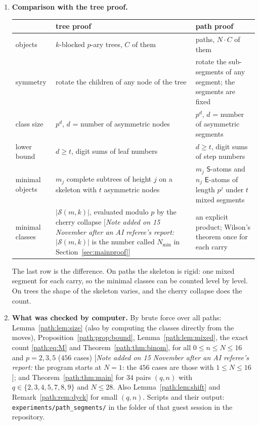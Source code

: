 \documentclass[11pt]{article}
\theoremstyle{definition}
\theoremstyle{remark}
\numberwithin{equation}{section}
\numberwithin{figure}{section}
\newcommand{\E}{\textsf{E}}
\newcommand{\Ss}{\textsf{S}}
\newcommand{\refnote}[1]{[\emph{Note added on 15 November after an AI referee's report:} #1]}
\begin{document}
\begin{enumerate}[leftmargin=*,itemsep=4pt]
\item \textbf{Comparison with the tree proof.}\nopagebreak[4]

\nopagebreak[4]\smallskip
{\small
\begin{tabular}{@{}p{}p{}p{}@{}}
\toprule
 & tree proof & path proof\\
\midrule
objects & $k$-blocked $p$-ary trees, $C$ of them & paths, $N\cdot C$ of them\\
symmetry & rotate the children of any node of the tree & rotate the sub-segments of any segment; the segments are fixed\\
class size & $p^{d}$, $d$ = number of asymmetric nodes & $p^{d}$, $d$ = number of asymmetric segments\\
lower bound & $d\ge t$, digit sums of leaf numbers & $d\ge t$, digit sums of step numbers\\
minimal objects & $m_j$ complete subtrees of height $j$ on a skeleton with $t$ asymmetric nodes
 & $m_j$ $\Ss$-atoms and $n_j$ $\E$-atoms of length $p^j$ under $t$ mixed segments\\
minimal classes & $|\mathcal S(m,k)|$, evaluated modulo $p$ by the cherry collapse \refnote{$|\mathcal S(m,k)|$ is the number called $N_{\min}$ in Section~\ref{sec:mainproof}} & an explicit product; Wilson's theorem once for each carry\\
\bottomrule
\end{tabular}}

\smallskip
The last row is the difference. On paths the skeleton is rigid: one mixed segment for each carry, so the minimal
classes can be counted level by level. On trees the shape of the skeleton varies, and the cherry collapse does
the count.

\item \textbf{What was checked by computer.} By brute force over all paths: Lemma~\ref{path:lem:size} (also by computing the
classes directly from the moves), Proposition~\ref{path:prop:bound}, Lemma~\ref{path:lem:mixed}, the exact count \eqref{path:eq:M}
and Theorem~\ref{path:thm:binom}, for all $0\le n\le N\le16$ and $p=2,3,5$ ($456$ cases)
\refnote{the program starts at $N=1$: the $456$ cases are those with $1\le N\le16$}; and Theorem~\ref{path:thm:main} for $34$
pairs $(q,n)$ with $q\in\{2,3,4,5,7,8,9\}$ and $N\le28$. Also Lemma~\ref{path:lem:shift} and
Remark~\ref{path:rem:dyck} for small $(q,n)$. Scripts and their output: \texttt{experiments/path\_segments/} in the folder of that guest session in the repository.
\end{enumerate}
\end{document}
